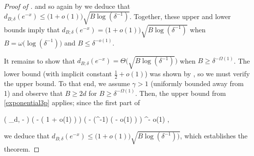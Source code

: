 \documentclass[10pt,a4paper]{article}
\theoremstyle{plain}\newtheorem{theorem}{Theorem}
\theoremstyle{definition}
\begin{document}
\begin{proof}[Proof of ]
	\noindent and so again by  we deduce that $d_{B; \delta} (e^{-x}) \le \big( 1 + o(1) \big) \sqrt{B \log (\delta^{-1})}$. Together, these upper and lower bounds imply that $d_{B; \delta} (e^{-x}) = \big( 1 + o(1) \big) \sqrt{B \log (\delta^{-1})}$ when $B = \omega \big( \log (\delta^{-1}) \big)$ and $B \le \delta^{-o(1)}$.
	
	It remains to show that $d_{B; \delta} (e^{-x}) = \Theta \big( \sqrt{B \log (\delta^{-1})} \big)$ when $B \ge \delta^{-\Omega(1)}$. The lower bound (with implicit constant $\frac{1}{2} + o(1)$) was shown by , so we must verify the upper bound. To that end, we assume $\gamma > 1$ (uniformly bounded away from 1) and observe that $B \ge 2d$ for $B \ge \delta^{-\Omega (1)}$. Then, the upper bound from \eqref{exponential3p} applies; since the first part of 
	\begin{flalign*}
	\exp ( \Psi_{d, \lambda} - \lambda) \le \exp \Big( - \displaystyle{} \big( 1 + o(1) \big) \Big) \le \exp \Big( - \log (\delta^{-1}) \big( \gamma - o(1) \big) \Big) \le \delta^{\gamma - o(1)} \le \delta,
    \end{flalign*}
	
	\noindent we deduce that $d_{B; \delta} (e^{-x}) \le \big( 1 + o(1) \big) \sqrt{B \log (\delta^{-1}))}$, which establishes the theorem.
	\end{proof} 
\end{document}
